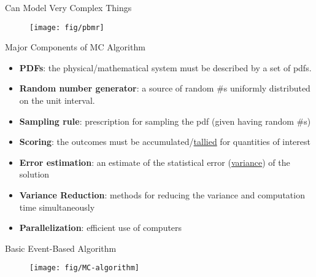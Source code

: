 \documentclass[xcolor=x11names,compress, handout]{beamer}
\renewcommand{\(}{\begin{columns}}
\renewcommand{\)}{\end{columns}}
\newcommand{\<}[1]{\begin{column}{#1}}
\renewcommand{\>}{\end{column}}
\begin{document}
\begin{frame}{Can Model Very Complex Things}

  	\begin{figure}
  	\begin{center}
  		\texttt{[image: fig/pbmr]}
	\end{center}
  	\end{figure}

\end{frame}

\begin{frame}{Major Components of MC Algorithm}

\begin{itemize}
  \item \textbf{PDFs}: the physical/mathematical system must be described by a set of pdfs.
  \pause
  \item \textbf{Random number generator}: a source of random \#s uniformly distributed on the unit interval.
  \pause
  \item \textbf{Sampling rule}: prescription for sampling the pdf (given having random \#s)
  \pause
  \item \textbf{Scoring}: the outcomes must be accumulated/\underline{tallied} for quantities of interest
  \pause
  \item \textbf{Error estimation}: an estimate of the statistical error (\underline{variance}) of the solution
    \pause
  \item \textbf{Variance Reduction}: methods for reducing the variance and computation time simultaneously
    \pause
  \item \textbf{Parallelization}: efficient use of computers
\end{itemize}
\end{frame}



\begin{frame}{Basic Event-Based Algorithm}

\begin{figure}[h!]
\begin{center}
  \texttt{[image: fig/MC-algorithm]}
\end{center}
  \label{fig:mc-algo}
\end{figure}

\end{frame}
\end{document}

